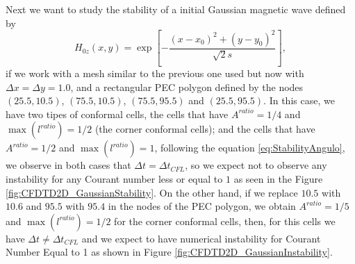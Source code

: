 \documentclass[12pt, oneside]{book}
\begin{document}
Next we want to study the stability of a initial Gaussian magnetic wave defined by 
\begin{equation}
    H_{0z}(x,y) = \exp \left[ - \dfrac{(x - x_0)^2 + (y - y_0)^2}{\sqrt{2} s} \right],
\label{eq:Gaussian2DInitialCondition}
\end{equation}
if we work with a mesh similar to the previous one used but now with $\Delta x = \Delta y = 1.0$, and a rectangular PEC polygon defined by the nodes $(25.5,10.5)$, $(75.5,10.5)$, $(75.5, 95.5)$ and $(25.5, 95.5)$. In this case, we have two tipes of conformal cells, the cells that have $A^{ratio} = 1/4$ and $\max({l^{ratio}}) = 1/2$ (the corner conformal cells); and the cells that have $A^{ratio} = 1/2$ and $\max({l^{ratio}}) = 1$, following the equation \ref{eq:StabilityAngulo}, we observe in both cases that $\Delta t = \Delta t_{CFL}$, so we expect not to observe any instability for any Courant number less or equal to $1$ as seen in the Figure \ref{fig:CFDTD2D_GaussianStability}. On the other hand, if we replace $10.5$ with $10.6$ and $95.5$ with $95.4$ in the nodes of the PEC polygon, we obtain $A^{ratio} = 1/5$ and $\max({l^{ratio}}) = 1/2$ for the corner conformal cells, then, for this cells we have $\Delta t \neq \Delta t_{CFL}$ and we expect to have numerical instability for Courant Number Equal to 1 as shown in Figure \ref{fig:CFDTD2D_GaussianInstability}.
\end{document}
